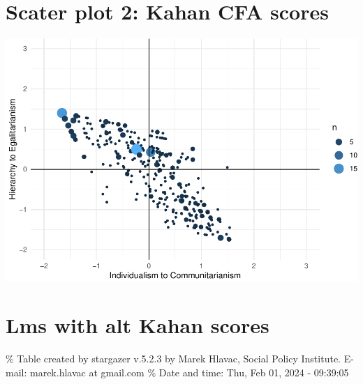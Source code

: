 \documentclass[
]{article}
\begin{document}
\hypertarget{scater-plot-2-kahan-cfa-scores}{%
\section{Scater plot 2: Kahan CFA
scores}\label{scater-plot-2-kahan-cfa-scores}}

\includegraphics{corstuff_files/figure-latex/unnamed-chunk-28-1.pdf}

\newpage

\hypertarget{lms-with-alt-kahan-scores}{%
\section{Lms with alt Kahan scores}\label{lms-with-alt-kahan-scores}}

\begingroup\setlength{\tabcolsep}{1pt}

\renewcommand{\arraystretch}{0.7}

\% Table created by stargazer v.5.2.3 by Marek Hlavac, Social Policy
Institute. E-mail: marek.hlavac at gmail.com \% Date and time: Thu, Feb
01, 2024 - 09:39:05
\end{document}
